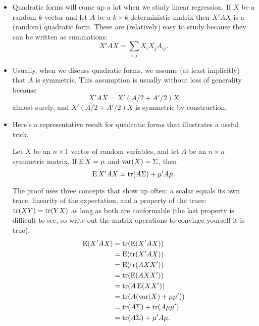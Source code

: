 \begin{itemize}

\item Quadratic forms will come up a lot when we study linear
  regression.  If $X$ be a random $k$-vector and let $A$ be a $k \times k$
  deterministic matrix then $X'A X$ is a (random) quadratic form.
  These are (relatively) easy to study because they can be written as
  summations:
  \begin{equation*}
    X'AX = \sum_{i,j} X_i X_j A_{ij}.
  \end{equation*}

\item Usually, when we discuss quadratic forms, we assume (at least
  implicitly) that $A$ is symmetric.  This assumption is usually
  without loss of generality because
  \begin{equation*}
    X' A X = X'(A/2 + A'/2)X
  \end{equation*}
  almost surely, and $X'(A/2 + A'/2)X$ is symmetric by construction.

\item Here's a representative result for quadratic forms that
  illustrates a useful trick.
  \begin{thm}
    Let $X$ be an $n \times 1$ vector of random variables, and
    let $A$ be an $n \times n$ symmetric matrix.  If $\operatorname{E} X = \mu$ and $\operatorname{var}(X) =
    \Sigma$, then
    \begin{equation}
      \operatorname{E} X'AX = \operatorname{tr}(A \Sigma) + \mu'A\mu.
    \end{equation}
  \end{thm}

  The proof uses three concepts that show up often: a scalar equals
  its own trace, linearity of the expectation, and a property of the
  trace: $\operatorname{tr}(XY) = \operatorname{tr}(YX)$ as long as both are conformable (the last
  property is difficult to see, so write out the matrix operations to
  convince yourself it is true).
  \begin{align*}
    \operatorname{E}(X'AX) &= \operatorname{tr}(\operatorname{E}(X'AX)) \\
    &= \operatorname{E}(\operatorname{tr}(X'AX)) \\
    &= \operatorname{E}(\operatorname{tr}(AXX')) \\
    &= \operatorname{tr}(\operatorname{E}(AXX')) \\
    &= \operatorname{tr}(A \operatorname{E}(XX')) \\
    &= \operatorname{tr}(A (\operatorname{var}(X) + \mu\mu')) \\
    &= \operatorname{tr}(A\Sigma) + \operatorname{tr}(A \mu\mu') \\
    &= \operatorname{tr}(A\Sigma) + \mu'A\mu.
  \end{align*}


\end{itemize}
